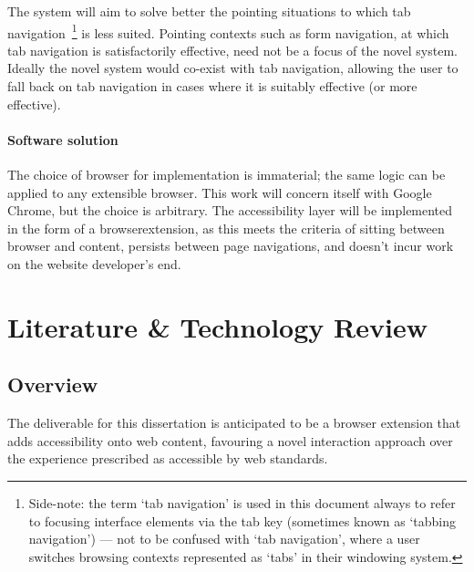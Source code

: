\documentclass[11pt,openright,a4paper]{report}
\begin{document}
The system will aim to solve better the pointing situations to which tab navigation~\footnote{Side-note: the term `tab navigation' is used in this document always to refer to focusing interface elements via the tab key (sometimes known as `tabbing navigation') --- not to be confused with `tab navigation', where a user switches browsing contexts represented as `tabs' in their windowing system.} is less suited. Pointing contexts such as form navigation, at which tab navigation is satisfactorily effective, need not be a focus of the novel system. Ideally the novel system would co-exist with tab navigation, allowing the user to fall back on tab navigation in cases where it is suitably effective (or more effective).
\subsubsection{Software solution}
\label{sec:softwaresolution}
The choice of browser for implementation is immaterial; the same logic can be applied to any extensible browser. This work will concern itself with Google Chrome, but the choice is arbitrary.
The accessibility layer will be implemented in the form of a \gls{browserextension}, as this meets the criteria of sitting between browser and content, persists between page navigations, and doesn't incur work on the website developer's end.

\chapter{Literature \& Technology Review}
\label{chap:litreview}
\section{Overview}
The deliverable for this dissertation is anticipated to be a browser extension that adds accessibility onto web content, favouring a novel interaction approach over the experience prescribed as accessible by web standards.
\end{document}
